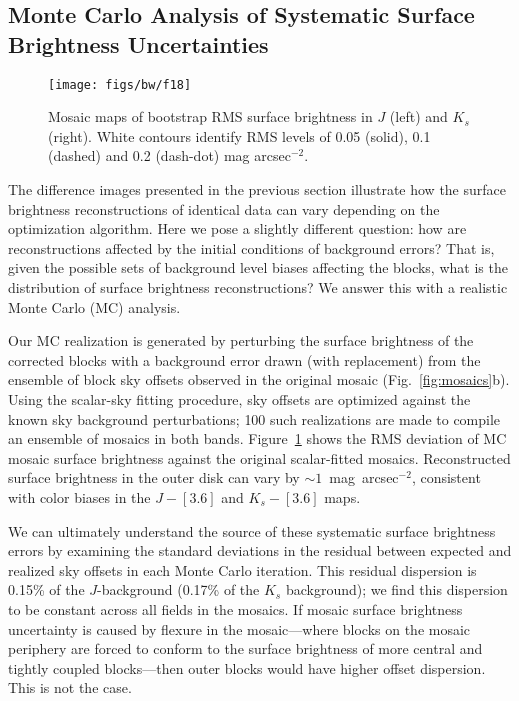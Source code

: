 \documentclass[iop,tighten]{emulateapj}
\newcommand{\Fig}[1]{Fig.~\ref{fig:#1}}  %
\begin{document}
\subsection{Monte Carlo Analysis of Systematic Surface Brightness Uncertainties}
\label{sec:montecarlo}

\begin{figure}[t]
\centering
\texttt{[image: figs/bw/f18]}
\caption{Mosaic maps of bootstrap RMS surface brightness in $J$ (left) and $K_s$ (right).
White contours identify RMS levels of 0.05 (solid), 0.1 (dashed) and 0.2 (dash-dot) mag arcsec$^{-2}$.}
\label{fig:bootstrap_sb_rms}
\end{figure}

The difference images presented in the previous section illustrate how the surface brightness reconstructions of identical data can vary depending on the optimization algorithm.
Here we pose a slightly different question: how are reconstructions affected by the initial conditions of background errors?
That is, given the possible sets of background level biases affecting the blocks, what is the distribution of surface brightness reconstructions?
We answer this with a realistic Monte Carlo (MC) analysis.

Our MC realization is generated by perturbing the surface brightness of the corrected blocks with a background error drawn (with replacement) from the ensemble of block sky offsets observed in the original mosaic (\Fig{mosaics}b).
Using the scalar-sky fitting procedure, sky offsets  are optimized against the known sky background perturbations; 100 such realizations are made to compile an ensemble of mosaics in both bands.
Figure~\ref{fig:bootstrap_sb_rms} shows the RMS deviation of MC mosaic surface brightness against the original scalar-fitted mosaics.
Reconstructed surface brightness in the outer disk can vary by $\sim 1$~mag~arcsec$^{-2}$, consistent with color biases in the $J-[3.6]$ and $K_s-[3.6]$ maps.

We can ultimately understand the source of these systematic surface brightness errors by examining the standard deviations in the residual between expected and realized sky offsets in each Monte Carlo iteration.
This residual dispersion is 0.15\% of the $J$-background (0.17\% of the $K_s$ background); we find this dispersion to be constant across all fields in the mosaics.
If mosaic surface brightness uncertainty is caused by flexure in the mosaic---where blocks on the mosaic periphery are forced to conform to the surface brightness of more central and tightly coupled blocks---then outer blocks would have higher offset dispersion.
This is not the case.
\end{document}
